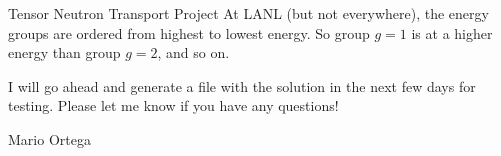 \documentclass[fontsize=12pt, paper=a4]{scrlttr2}
\begin{document}
\begin{letter}{Tensor Neutron Transport Project}
At LANL (but not everywhere), the energy groups are ordered from highest to lowest energy. So group $g=1$ is at a higher energy than group $g=2$, and so on.

I will go ahead and generate a file with the solution in the next few days for testing. Please let me know if you have any questions!

\closing{Mario Ortega} %

\end{letter}
\end{document}

